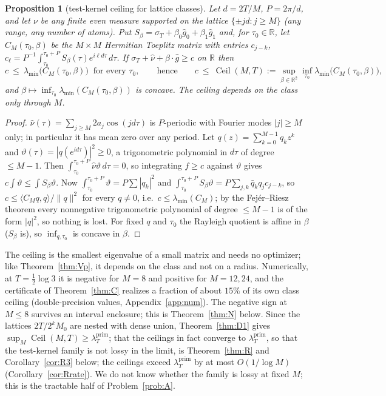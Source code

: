 \documentclass[11pt]{amsart}
\newtheorem{proposition}[theorem]{Proposition}
\theoremstyle{definition}
\theoremstyle{remark}
\newcommand{\R}{\mathbb R}
\newcommand{\lamP}{\lambda^{\mathrm{prim}}_T}
\newcommand{\sT}{\sigma_T}
\newcommand{\gh}[1]{\widehat g_{#1}}
\newcommand{\nuh}{\widehat\nu}
\begin{document}
\begin{proposition}[test-kernel ceiling for lattice classes]\label{prop:TK}
Let $d=2T/M$, $P=2\pi/d$, and let $\nu$ be any finite even measure supported on the lattice
$\{\pm jd:j\ge M\}$ (any range, any number of atoms). Put $S_\beta=\sT+\beta_0\gh0+\beta_1\gh1$ and,
for $\tau_0\in\R$, let $C_M(\tau_0,\beta)$ be the $M\times M$ Hermitian Toeplitz matrix with entries
$c_{j-k}$, $c_\ell=P^{-1}\int_{\tau_0}^{\tau_0+P}S_\beta(\tau)e^{i\ell d\tau}\,d\tau$. If
$\sT+\nuh+\beta\cdot\widehat g\ge c$ on $\R$ then
\[
c\ \le\ \lambda_{\min}\big(C_M(\tau_0,\beta)\big)\ \text{ for every }\tau_0,\qquad\text{hence}\qquad
c\ \le\ \operatorname{Ceil}(M,T):=\sup_{\beta\in\R^2}\inf_{\tau_0}\lambda_{\min}\big(C_M(\tau_0,\beta)\big),
\]
and $\beta\mapsto\inf_{\tau_0}\lambda_{\min}(C_M(\tau_0,\beta))$ is concave. The ceiling depends on
the class only through $M$.
\end{proposition}
\begin{proof}
$\nuh(\tau)=\sum_{j\ge M}2a_j\cos(jd\tau)$ is $P$-periodic with Fourier modes $|j|\ge M$ only; in
particular it has mean zero over any period. Let $q(z)=\sum_{k=0}^{M-1}q_kz^k$ and
$\vartheta(\tau)=|q(e^{id\tau})|^2\ge0$, a trigonometric polynomial in $d\tau$ of degree $\le M-1$. Then
$\int_{\tau_0}^{\tau_0+P}\nuh\vartheta\,d\tau=0$, so integrating $f\ge c$ against $\vartheta$ gives
$c\int\vartheta\le\int S_\beta\vartheta$. Now $\int_{\tau_0}^{\tau_0+P}\vartheta=P\sum|q_k|^2$ and
$\int_{\tau_0}^{\tau_0+P}S_\beta\vartheta=P\sum_{j,k}\bar q_kq_jc_{j-k}$, so
$c\le\langle C_Mq,q\rangle/\|q\|^2$ for every $q\ne0$, i.e.\ $c\le\lambda_{\min}(C_M)$; by the
Fejér--Riesz theorem every nonnegative trigonometric polynomial of degree $\le M-1$ is of the form
$|q|^2$, so nothing is lost. For fixed $q$ and $\tau_0$ the Rayleigh quotient is affine in $\beta$
($S_\beta$ is), so $\inf_{q,\tau_0}$ is concave in $\beta$.
\end{proof}

The ceiling is the smallest eigenvalue of a small matrix and needs no optimizer; like
Theorem~\ref{thm:Vp}, it depends on the class and not on a radius. Numerically, at
$T=\frac12\log3$ it is negative for $M=8$ and positive for $M=12,24$, and the certificate of
Theorem~\ref{thm:C} realizes a fraction of about $15\%$ of its own class ceiling
(double-precision values, Appendix~\ref{app:num}). The negative sign at $M\le8$ survives an interval enclosure; this is
Theorem~\ref{thm:N} below. Since the lattices $2T/2^kM_0$ are nested with dense union,
Theorem~\ref{thm:D1} gives $\sup_M\operatorname{Ceil}(M,T)\ge\lamP$; that the ceilings in fact
converge to $\lamP$, so that the test-kernel family is not lossy in the limit, is
Theorem~\ref{thm:R} and Corollary~\ref{cor:R3} below; the ceilings exceed $\lamP$ by at most $O(1/\log M)$
(Corollary~\ref{cor:Rrate}). We do not know whether the family is lossy at fixed $M$; this is the tractable half of
Problem~\ref{prob:A}.
\end{document}
